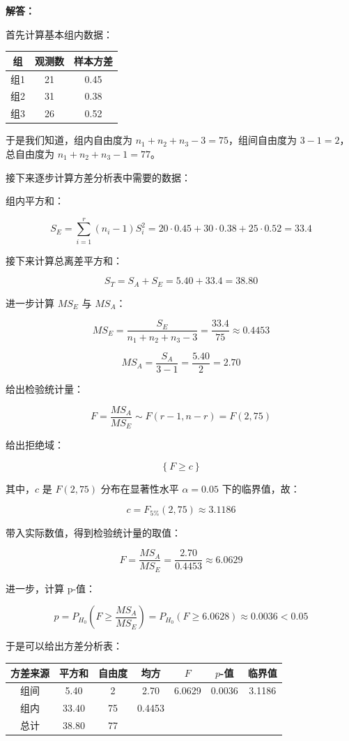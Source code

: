 \documentclass[12pt,a4paper]{article}
\begin{document}
\begin{answerbox}
\textbf{解答：}

首先计算基本组内数据：

\begin{center}
\renewcommand{\arraystretch}{1.2}
\begin{tabular}{c|c|c}
\hline
组 & 观测数 & 样本方差 \\
\hline
组1 & 21 & 0.45 \\
组2 & 31 & 0.38 \\
组3 & 26 & 0.52 \\
\hline
\end{tabular}
\end{center}

于是我们知道，组内自由度为 $n_1 + n_2 + n_3 - 3 = 75$，组间自由度为 $3 - 1 = 2$，总自由度为 $n_1 + n_2 + n_3 - 1 = 77$。

接下来逐步计算方差分析表中需要的数据：

组内平方和： 

$$
S_E = \sum_{i=1}^{r} (n_i - 1) S_i^2 = 20 \cdot 0.45 + 30 \cdot 0.38 + 25 \cdot 0.52 = 33.4
$$

接下来计算总离差平方和：

$$
S_T = S_A + S_E = 5.40 + 33.4 = 38.80
$$

进一步计算 $MS_E$ 与 $MS_A$：

$$
MS_E = \frac{S_E}{n_1 + n_2 + n_3 - 3} = \frac{33.4}{75} \approx 0.4453
$$

$$
MS_A = \frac{S_A}{3 - 1} = \frac{5.40}{2} = 2.70
$$

给出检验统计量：

$$
F = \frac{MS_A}{MS_E} \sim F(r-1, n-r) = F(2, 75)
$$

给出拒绝域：

$$
\left\{F \geq c\right\}
$$

其中，$c$ 是 $F(2, 75)$ 分布在显著性水平 $\alpha=0.05$ 下的临界值，故：

$$
c = F_{5\%}(2, 75) \approx 3.1186
$$

带入实际数值，得到检验统计量的取值：

$$
F = \frac{MS_A}{MS_E} = \frac{2.70}{0.4453} \approx 6.0629
$$

进一步，计算 p-值：

$$
p = P_{H_0}\left(F \geq \frac{MS_A}{MS_E}\right) = P_{H_0}\left(F \geq 6.0628\right) \approx 0.0036 < 0.05
$$

于是可以给出方差分析表：

\begin{center}
\renewcommand{\arraystretch}{1.2}
\begin{tabular}{c|c|c|c|c|c|c}
\hline
方差来源 & 平方和 & 自由度 & 均方 & \(F\) & \(p\)-值 & 临界值 \\
\hline
组间 & 5.40 & 2 & 2.70 & 6.0629 & 0.0036 & 3.1186 \\
组内 & 33.40 & 75 & 0.4453 &  &  &  \\
总计 & 38.80 & 77 &  &  &  &  \\
\hline
\end{tabular}
\end{center}


\end{answerbox}
\end{document}
